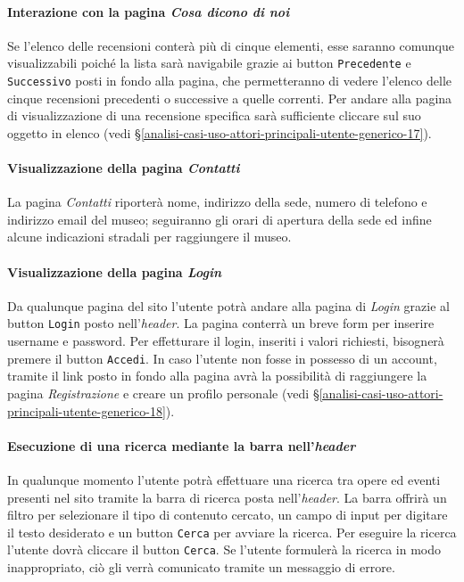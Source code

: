 \paragraph{Interazione con la pagina \textit{Cosa dicono di noi}}
\label{analisi-casi-uso-attori-principali-utente-generico-9}
Se l'elenco delle recensioni conterà più di cinque elementi, esse saranno comunque visualizzabili poiché la lista sarà navigabile grazie ai button \texttt{Precedente} e \texttt{Successivo} posti in fondo alla pagina, che permetteranno di vedere l'elenco delle cinque recensioni precedenti o successive a quelle correnti. Per andare alla pagina di visualizzazione di una recensione specifica sarà sufficiente cliccare sul suo oggetto in elenco (vedi §\ref{analisi-casi-uso-attori-principali-utente-generico-17}).


\paragraph{Visualizzazione della pagina \textit{Contatti}}
\label{analisi-casi-uso-attori-principali-utente-generico-10}
La pagina \textit{Contatti} riporterà nome, indirizzo della sede, numero di telefono e indirizzo email del museo; seguiranno gli orari di apertura della sede ed infine alcune indicazioni stradali per raggiungere il museo.


\paragraph{Visualizzazione della pagina \textit{Login}}
\label{analisi-casi-uso-attori-principali-utente-generico-11}
Da qualunque pagina del sito l'utente potrà andare alla pagina di \textit{Login} grazie al button \texttt{Login} posto nell'\textit{header}. La pagina conterrà un breve form per inserire username e password. Per effetturare il login, inseriti i valori richiesti, bisognerà premere il button \texttt{Accedi}. In caso l'utente non fosse in possesso di un account, tramite il link posto in fondo alla pagina avrà la possibilità di raggiungere la pagina \textit{Registrazione} e creare un profilo personale (vedi §\ref{analisi-casi-uso-attori-principali-utente-generico-18}).


\paragraph{Esecuzione di una ricerca mediante la barra nell'\textit{header}}
\label{analisi-casi-uso-attori-principali-utente-generico-12}
In qualunque momento l'utente potrà effettuare una ricerca tra opere ed eventi presenti nel sito tramite la barra di ricerca posta nell'\textit{header}. La barra offrirà un filtro per selezionare il tipo di contenuto cercato, un campo di input per digitare il testo desiderato e un button \texttt{Cerca} per avviare la ricerca. Per eseguire la ricerca l'utente dovrà cliccare il button \texttt{Cerca}. Se l'utente formulerà la ricerca in modo inappropriato, ciò gli verrà comunicato tramite un messaggio di errore.


